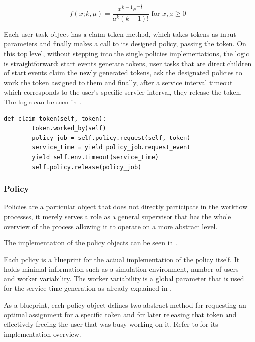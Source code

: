 \documentclass{seal_thesis}
\begin{document}
\begin{equation}
\label{eq:erlang_density}
	f(x;k,\mu) = \frac{x^{k-1} e^{-\frac{x}{\mu}}}{\mu^k (k-1)!} \text{ for } x,\mu \geq 0
\end{equation}

Each user task object has a claim token method, which takes tokens as input parameters and finally makes a call to its designed policy, passing the token. On this top level, without stepping into the single policies implementations, the logic is straightforward: start events generate tokens, user tasks that are direct children of start events claim the newly generated tokens, ask the designated policies to work the token assigned to them and finally, after a service interval timeout which corresponds to the user's specific service interval, they release the token. The logic can be seen in .

\begin{lstlisting}[caption=User task claim method,label=lst:user_task,style=CustomPython]
    def claim_token(self, token):
        token.worked_by(self)
        policy_job = self.policy.request(self, token)
        service_time = yield policy_job.request_event
        yield self.env.timeout(service_time)
        self.policy.release(policy_job)
\end{lstlisting}

\subsubsection{Policy}

Policies are a particular object that does not directly participate in the workflow processes, it merely serves a role as a general supervisor that has the whole overview of the process allowing it to operate on a more abstract level. 

The implementation of the policy objects can be seen in .


Each policy is a blueprint for the actual implementation of the policy itself. It holds minimal information such as a simulation environment, number of users and worker variability. The worker variability is a global parameter that is used for the service time generation as already explained in .

As a blueprint, each policy object defines two abstract method for requesting an optimal assignment for a specific token and for later releasing that token and effectively freeing the user that was busy working on it. Refer to  for its implementation overview.
\end{document}
